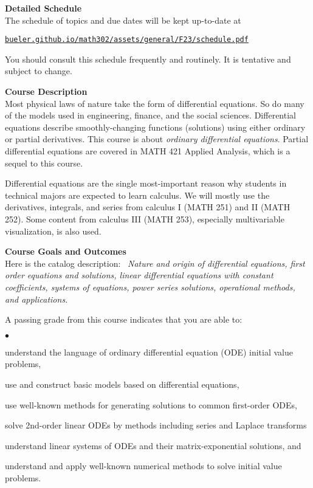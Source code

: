 \documentclass[12pt]{article}
\renewcommand{\emph}[1]{\textsf{\textbf{#1}}}
\newcommand{\localhead}[1]{\par\smallskip\textbf{#1}\nobreak\\}%
\def\heading#1{\localhead{\large\emph{#1}}}
\newenvironment{clist}%
{\bgroup\parskip 0pt\begin{list}{$\bullet$}{\partopsep 4pt\topsep 0pt\itemsep -2pt}}%
{\end{list}\egroup}%
\begin{document}
\medskip

\cfoot{\thepage}

\heading{Detailed Schedule}
The schedule of topics and due dates will be kept up-to-date at

\smallskip
\centerline{\href{https://bueler.github.io/math302/assets/general/F23/schedule.pdf}{\tt bueler.github.io/math302/assets/general/F23/schedule.pdf}}

You should consult this schedule frequently and routinely.  It is tentative and subject to change.


\medskip
\heading{Course Description}
Most physical laws of nature take the form of differential equations.  So do many of the models used in engineering, finance, and the social sciences.  Differential equations describe smoothly-changing functions (solutions) using either ordinary or partial derivatives.  This course is about \textsl{ordinary differential equations}.  Partial differential equations are covered in MATH 421 Applied Analysis, which is a sequel to this course.

Differential equations are the single most-important reason why students in technical majors are expected to learn calculus.  We will mostly use the derivatives, integrals, and series from calculus I (MATH 251) and II (MATH 252).  Some content from calculus III (MATH 253), especially multivariable visualization, is also used.


\bigskip\bigskip
\clearpage\newpage
\heading{Course Goals and Outcomes}
Here is the catalog description: \, \textsl{Nature and origin of differential equations, first order equations and solutions, linear differential equations with constant coefficients, systems of equations, power series solutions, operational methods, and applications.}

A passing grade from this course indicates that you are able to:

\begin{clist}
\item understand the language of ordinary differential equation (ODE) initial value problems,
\item use and construct basic models based on differential equations,
\item use well-known methods for generating solutions to common first-order ODEs,
\item solve 2nd-order linear ODEs by methods including series and Laplace transforms
\item understand linear systems of ODEs and their matrix-exponential solutions, and
\item understand and apply well-known numerical methods to solve initial value problems.
\end{clist}
\end{document}

